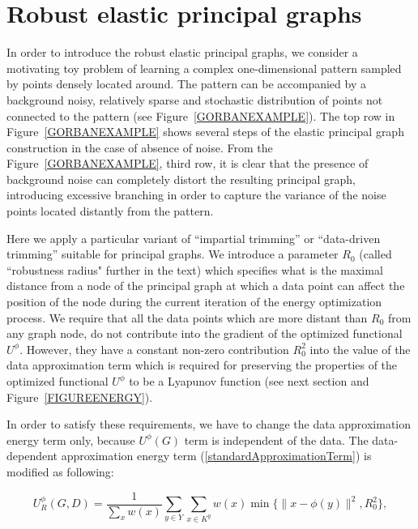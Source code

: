 \documentclass[graybox]{archivesofdatascience}
\begin{document}
\fi



\section{Robust elastic principal graphs}\label{robustPGs}


In order to introduce the robust elastic principal graphs, we consider a motivating toy problem of learning a complex one-dimensional pattern sampled by
points densely located around. The pattern can be accompanied by a background noisy, relatively sparse and stochastic distribution of points not connected to the pattern
(see Figure~\ref{GORBANEXAMPLE}). The top row in Figure~\ref{GORBANEXAMPLE} shows several steps of the elastic principal graph construction in the case
of absence of noise.  From the Figure~\ref{GORBANEXAMPLE}, third row, it is clear that the presence of background noise can completely distort the
resulting principal graph, introducing excessive branching in order to capture the variance of the noise points located distantly from the pattern.

Here we apply a particular variant of ``impartial trimming'' \citep{gordaliza1991best} or ``data-driven trimming'' suitable for principal graphs.
We introduce a parameter $R_0$ (called ``robustness radius" further in the text) which specifies what is the maximal
distance from a node of the principal graph at which a data point can affect the position of the node during the current iteration of the energy optimization process.
We require that all the data points which are more distant than $R_0$ from any graph node, do not contribute into the gradient of the optimized functional $U^{\phi}$.
However, they have a constant non-zero contribution $R_0^2$ into the value of the data approximation term which is required for preserving the properties of the
optimized functional $U^{\phi}$ to be a Lyapunov function (see next section and Figure~\ref{FIGUREENERGY}).

In order to satisfy these requirements, we have to change the data approximation energy term only, because $U^{\phi}{(G)}$ term is independent of the data. The data-dependent approximation energy term (\ref{standardApproximationTerm}) is modified as following:

\begin{equation}\label{robustApproximationTerm}
U^{\phi}_R(G,D)= \frac{1}{\sum_{x} w(x)}\sum_{y \in Y} \sum_{x \in K^y} w(x) \min \{\|x-
\phi(y)\|^2,R_0^2\},
\end{equation}
\end{document}
